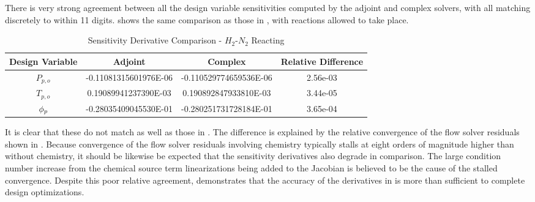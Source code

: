 There is very strong agreement between all the design variable sensitivities
computed by the adjoint and complex solvers, with all matching discretely to
within 11 digits.   shows the same comparison as
those in , with reactions allowed to take place.
\begin{table}[h]
  \centering
  \begin{tabular}{c|c|c|c}
    Design Variable & Adjoint & Complex & Relative Difference\\
    \hline
    $P_{p,o}$ & -0.11081315601976E-06 & -0.110529774659536E-06 & 2.56e-03 \\
    $T_{p,o}$ &  0.19089941237390E-03 &  0.190892847933810E-03 & 3.44e-05 \\
    $\phi_p$     & -0.28035409045530E-01 & -0.280251731728184E-01 & 3.65e-04
  \end{tabular}
  \caption{Sensitivity Derivative Comparison - $H_2$-$N_2$ Reacting}
  \label{tab:react-deriv-check}
\end{table}
It is clear that these do not match as well as those in
.  The difference is explained
by the relative convergence of the flow solver residuals shown in
.  Because convergence of the flow solver residuals
involving chemistry typically stalls at eight orders of magnitude higher than
without chemistry, it should be likewise be expected that the sensitivity
derivatives also degrade in comparison.  The large condition number increase
from the chemical source term linearizations being added to the Jacobian is
believed to be the cause of the stalled convergence. Despite this poor relative
agreement,  demonstrates that the accuracy of
the derivatives in  is more than sufficient to
complete design optimizations.
